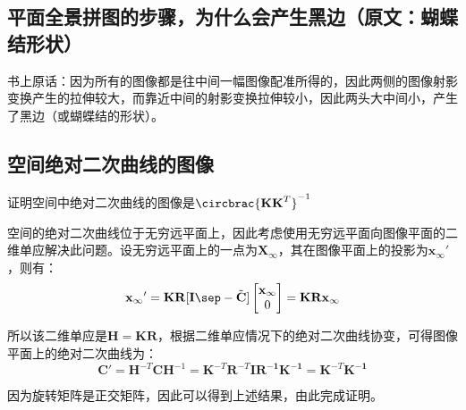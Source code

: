 \documentclass[11pt]{article}
\begin{document}
\subsection{平面全景拼图的步骤，为什么会产生黑边（原文：蝴蝶结形状）}
\label{subsec:平面全景拼图的步骤，为什么会产生黑边（原文：蝴蝶结形状）}
书上原话：因为所有的图像都是往中间一幅图像配准所得的，因此两侧的图像射影变换产生的拉伸较大，而靠近中间的射影变换拉伸较小，因此两头大中间小，产生了黑边（或蝴蝶结的形状）。\par
\subsection{空间绝对二次曲线的图像}
{\heiti 证明空间中绝对二次曲线的图像是$\circbrac{\mathbf{KK}^{T}}^{-1}$}\par
空间的绝对二次曲线位于无穷远平面上，因此考虑使用无穷远平面向图像平面的二维单应解决此问题。设无穷远平面上的一点为$\mathbf{X}_\infty$，其在图像平面上的投影为${\mathbf{x}_\infty}'$，则有：
\begin{equation*}
  {\mathbf{x}_\infty}'=\mathbf{KR[I\sep} -\tilde{\mathbf{C}}]\begin{bmatrix}
    \mathbf{x}_\infty \\0
  \end{bmatrix}=\mathbf{KRx}_\infty
\end{equation*}\par
所以该二维单应是$\mathbf{H=KR}$，根据二维单应情况下的绝对二次曲线协变，可得图像平面上的绝对二次曲线为：
\begin{equation*}
  \mathbf{C}'=\mathbf{H}^{-T}\mathbf{CH}^{-1}=\mathbf{K^\mathit{-T}R^\mathit{-T}IR^{-1}K^{-1}}=\mathbf{K^\mathit{-T}K^{-1}}
\end{equation*}\par
因为旋转矩阵是正交矩阵，因此可以得到上述结果，由此完成证明。
\end{document}
